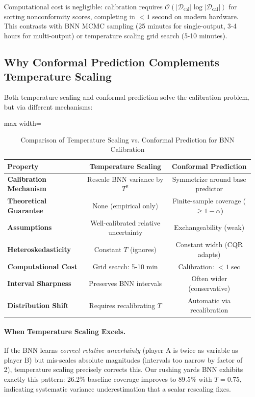 Computational cost is negligible: calibration requires $\mathcal{O}(|\mathcal{D}_{\text{cal}}| \log |\mathcal{D}_{\text{cal}}|)$ for sorting nonconformity scores, completing in $<1$ second on modern hardware. This contrasts with BNN MCMC sampling (25 minutes for single-output, 3-4 hours for multi-output) or temperature scaling grid search (5-10 minutes).

\subsection{Why Conformal Prediction Complements Temperature Scaling}\label{subsec:conformal-vs-temperature}

Both temperature scaling and conformal prediction solve the calibration problem, but via different mechanisms:

\begin{table}[t]
\centering
\caption{Comparison of Temperature Scaling vs. Conformal Prediction for BNN Calibration}
\label{tab:temp-vs-conformal}
\begin{adjustbox}{max width=\textwidth}
\begin{tabular}{@{}lcc@{}}
\toprule
\textbf{Property} & \textbf{Temperature Scaling} & \textbf{Conformal Prediction} \\
\midrule
\textbf{Calibration Mechanism} & Rescale BNN variance by $T^2$ & Symmetrize around base predictor \\
\textbf{Theoretical Guarantee} & None (empirical only) & Finite-sample coverage ($\geq 1-\alpha$) \\
\textbf{Assumptions} & Well-calibrated relative uncertainty & Exchangeability (weak) \\
\textbf{Heteroskedasticity} & Constant $T$ (ignores) & Constant width (CQR adapts) \\
\textbf{Computational Cost} & Grid search: 5-10 min & Calibration: $<1$ sec \\
\textbf{Interval Sharpness} & Preserves BNN intervals & Often wider (conservative) \\
\textbf{Distribution Shift} & Requires recalibrating $T$ & Automatic via recalibration \\
\bottomrule
\end{tabular}
\end{adjustbox}
\end{table}

\paragraph{When Temperature Scaling Excels.}
If the BNN learns \textit{correct relative uncertainty} (player A is twice as variable as player B) but mis-scales absolute magnitudes (intervals too narrow by factor of 2), temperature scaling precisely corrects this. Our rushing yards BNN exhibits exactly this pattern: 26.2\% baseline coverage improves to 89.5\% with $T=0.75$, indicating systematic variance underestimation that a scalar rescaling fixes.

